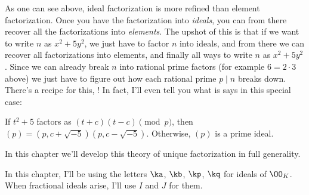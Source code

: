 As one can see above,
ideal factorization is more refined than element factorization.
Once you have the factorization into \emph{ideals},
you can from there recover all the factorizations into \emph{elements}.
The upshot of this is that if we want to write $n$ as $x^2+5y^2$,
we just have to factor $n$ into ideals,
and from there we can recover all factorizations into elements,
and finally all ways to write $n$ as $x^2+5y^2$.
Since we can already break $n$ into rational prime factors
(for example $6 = 2 \cdot 3$ above)
we just have to figure out how each rational prime $p \mid n$ breaks down.
There's a recipe for this, !
In fact, I'll even tell you what is says in this special case:
\begin{itemize}
	\ii If $t^2+5$ factors as $(t+c)(t-c) \pmod p$,
	then $(p) = (p, c+\sqrt{-5})(p, c-\sqrt{-5})$.
	\ii Otherwise, $(p)$ is a prime ideal.
\end{itemize}
In this chapter we'll develop this theory of unique factorization in full generality.


\begin{remark}
	In this chapter, I'll be using the letters $\ka$, $\kb$, $\kp$, $\kq$
	for ideals of $\OO_K$.
	When fractional ideals arise, I'll use $I$ and $J$ for them.
\end{remark}

